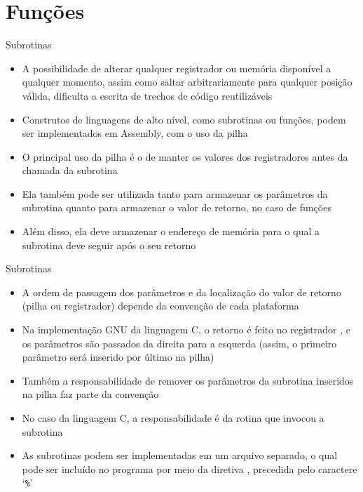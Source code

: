 \section{Funções}

\begin{frame}[fragile]{Subrotinas}

    \begin{itemize}
        \item A possibilidade de alterar qualquer registrador ou memória disponível a qualquer
            momento, assim como saltar arbitrariamente para qualquer posição válida, dificulta
            a escrita de trechos de código reutilizáveis

        \item Construtos de linguagens de alto nível, como subrotinas ou funções, podem ser 
            implementados em Assembly, com o uso da pilha

        \item O principal uso da pilha é o de manter os valores dos registradores antes da
            chamada da subrotina

        \item Ela também pode ser utilizada tanto para armazenar os parâmetros da subrotina 
            quanto para armazenar o valor de retorno, no caso de funções

        \item Além disso, ela deve armazenar o endereço de memória para o qual a subrotina 
            deve seguir após o seu retorno
    \end{itemize}

\end{frame}

\begin{frame}[fragile]{Subrotinas}

    \begin{itemize}
        \item A ordem de passagem dos parâmetros e da localização do valor de retorno (pilha ou
            registrador) depende da convenção de cada plataforma

        \item Na implementação GNU da linguagem C, o retorno é feito no registrador 
            , e os parâmetros são passados da direita para a esquerda (assim,
            o primeiro parâmetro será inserido por último na pilha)

        \item Também a responsabilidade de remover os parâmetros da subrotina inseridos na
            pilha faz parte da convenção

        \item No caso da linguagem C, a responsabilidade é da rotina que invocou a subrotina

        \item As subrotinas podem ser implementadas em um arquivo separado, o qual pode ser
            incluído no programa por meio da diretiva , precedida pelo
            caractere `\verb|%|'
    \end{itemize}

\end{frame}

